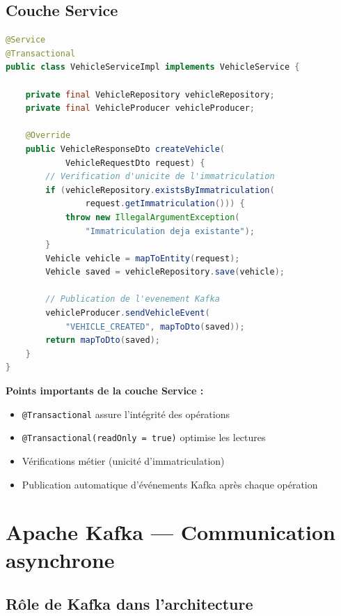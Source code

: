 \documentclass[12pt,a4paper]{report}
\begin{document}
\section{Couche Service}

\begin{lstlisting}[style=javastyle, language=Java, caption={Extrait de VehicleServiceImpl.java}]
@Service
@Transactional
public class VehicleServiceImpl implements VehicleService {

    private final VehicleRepository vehicleRepository;
    private final VehicleProducer vehicleProducer;

    @Override
    public VehicleResponseDto createVehicle(
            VehicleRequestDto request) {
        // Verification d'unicite de l'immatriculation
        if (vehicleRepository.existsByImmatriculation(
                request.getImmatriculation())) {
            throw new IllegalArgumentException(
                "Immatriculation deja existante");
        }
        Vehicle vehicle = mapToEntity(request);
        Vehicle saved = vehicleRepository.save(vehicle);

        // Publication de l'evenement Kafka
        vehicleProducer.sendVehicleEvent(
            "VEHICLE_CREATED", mapToDto(saved));
        return mapToDto(saved);
    }
}
\end{lstlisting}

\begin{infobox}
\textbf{Points importants de la couche Service :}
\begin{itemize}[nosep]
    \item \texttt{@Transactional} assure l'int\'egrit\'e des op\'erations
    \item \texttt{@Transactional(readOnly = true)} optimise les lectures
    \item V\'erifications m\'etier (unicit\'e d'immatriculation)
    \item Publication automatique d'\'ev\'enements Kafka apr\`es chaque op\'eration
\end{itemize}
\end{infobox}

\chapter{Apache Kafka --- Communication asynchrone}

\section{R\^ole de Kafka dans l'architecture}
\end{document}
